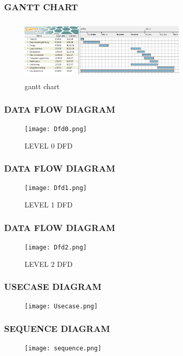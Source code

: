 \documentclass{beamer} %
\theoremstyle{definition} %
\begin{document}
\begin{frame}
\frametitle{GANTT CHART}
\begin{figure}[center]
\includegraphics[width=8cm,height=3cm]{newgc.png}
\caption{gantt chart}
\end{figure}
\end{frame}

\begin{frame}
\frametitle{DATA FLOW DIAGRAM}
\begin{figure}[center]
\texttt{[image: Dfd0.png]}
\caption{LEVEL 0 DFD}
\end{figure}
\end{frame}

\begin{frame}
\frametitle{DATA FLOW DIAGRAM}
\begin{figure}[center]
\texttt{[image: Dfd1.png]}
\caption{LEVEL 1 DFD}
\end{figure}
\end{frame}

\begin{frame}
\frametitle{DATA FLOW DIAGRAM}
\begin{figure}[center]
\texttt{[image: Dfd2.png]}
\caption{LEVEL 2 DFD}
\end{figure}
\end{frame}


\begin{frame}
\frametitle{USECASE DIAGRAM}
\begin{figure}[center]
\texttt{[image: Usecase.png]}
\end{figure}
\end{frame}


\begin{frame}
\frametitle{SEQUENCE DIAGRAM}
\begin{figure}[center]
\texttt{[image: sequence.png]}
\end{figure}
\end{frame}
\end{document}
